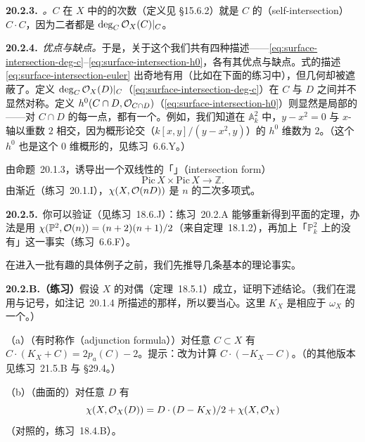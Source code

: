 \textbf{20.2.3.}\ \emph{\trhRemark。}\quad $C$ 在 $X$ 中的\trNormalBundle{}的次数（定义见 \S15.6.2）就是 $C$ 的\textbf{\trSelfIntersection}（self-intersection）$C\cdot C$，因为二者都是 $\deg_C\mathcal{O}_X(C)|_C$。

\textbf{20.2.4.}\ \emph{优点与缺点。}\quad 于是，关于这个\trIntersectionNumber{}我们共有四种描述——\eqref{eq:surface-intersection-deg-c}--\eqref{eq:surface-intersection-h0}，各有其优点与缺点。\trEulerCharacteristic{}式的描述 \eqref{eq:surface-intersection-euler} 出奇地有用（比如在下面的练习中），但几何却被遮蔽了。定义 $\deg_C\mathcal{O}_X(D)|_C$（\eqref{eq:surface-intersection-deg-c}）在 $C$ 与 $D$ 之间并不显然对称。定义 $h^0(C\cap D,\mathcal{O}_{C\cap D})$（\eqref{eq:surface-intersection-h0}）则显然是局部的——对 $C\cap D$ 的每一点，都有一个\trVectorSpace。例如，我们知道在 $\mathbb{A}^2_k$ 中，$y-x^2=0$ 与 $x$-轴以重数 $2$ 相交，因为概形论交（$k[x,y]/(y-x^2,y)$）的 $h^0$ 维数为 $2$。（这个 $h^0$ 也是这个 $0$ 维概形的\trLength，见\mbox{练习~6.6.Y}。）

由\mbox{命题~20.1.3}，\trIntersectionNumber{}诱导出一个双线性的「\trIntersectionForm」（intersection form）
\begin{equation*}\tag{20.2.4.1}\label{eq:surface-intersection-form}
\mathrm{Pic}\,X\times\mathrm{Pic}\,X\longrightarrow\mathbb{Z}.
\end{equation*}
由渐近\trRiemannRoch{}（\mbox{练习~20.1.I}），$\chi(X,\mathcal{O}(nD))$ 是 $n$ 的二次多项式。

\textbf{20.2.5.}\ 你可以验证（见\mbox{练习~18.6.J}）：\mbox{练习~20.2.A} 能够重新得到平面\trCurve{}的\trBezout{}定理，办法是用 $\chi(\mathbb{P}^2,\mathcal{O}(n))=(n+2)(n+1)/2$（来自\mbox{定理~18.1.2}），再加上「$\mathbb{P}^2_k$ 上的\trEffectiveCartierDivisor{}没有\trEmbeddedPoint」这一事实（\mbox{练习~6.6.F}）。

在进入一批有趣的具体例子之前，我们先推导几条基本的理论事实。

\textbf{20.2.B.（练习）}\quad 假设\trSmooth\trProjective\trSurface{} $X$ 的\trSerre{}对偶（\mbox{定理~18.5.1}）成立，证明下述结论。（我们在混用\trDivisor{}与\trInvertibleSheaf{}记号，如\mbox{注记~20.1.4} 所描述的那样，所以要当心。这里 $K_X$ 是相应于 $\omega_X$ 的一个\trDivisor。）

（a）（有时称作\textbf{\trAdjunctionFormula}（adjunction formula））对任意\trCurve{} $C\subset X$ 有 $C\cdot(K_X+C)=2p_a(C)-2$。提示：改为计算 $C\cdot(-K_X-C)$。（\trAdjunctionFormula{}的其他版本见\mbox{练习~21.5.B} 与 \S29.4。）

（b）（曲面的\trRiemannRoch）对任意\trWeilDivisor{} $D$ 有
\[
\chi(X,\mathcal{O}_X(D))=D\cdot(D-K_X)/2+\chi(X,\mathcal{O}_X)
\]
（对照\trCurve{}的\trRiemannRoch，\mbox{练习~18.4.B}）。

